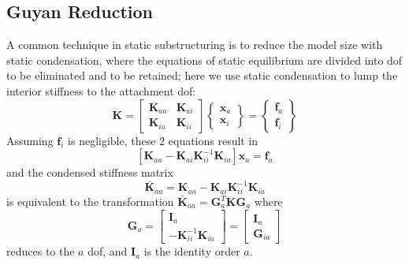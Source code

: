 \documentclass[10pt,openany,twoside]{book}
\numberwithin{equation}{section}   %
\newcommand{\Matrix}[1]{\boldsymbol{#1}}
\newcommand{\Vector}[1]{\boldsymbol{#1}}
\begin{document}
\subsection{\label{sect:guyan-red}Guyan Reduction}
A common technique in static substructuring is to reduce the
model size with static condensation, where the equations of
static equilibrium are divided into dof to be eliminated and to be
retained; here we use static condensation to lump the interior stiffness 
to the attachment dof:
\begin{equation}
\Matrix{K} = \left[
\begin{array}{cc}
   \Matrix{K}_{aa} & \Matrix{K}_{ai} \\
   \Matrix{K}_{ia} & \Matrix{K}_{ii}
\end{array}
\right]
\left\{
\begin{array}{c}
   \Vector{x}_a \\
   \Vector{x}_i
\end{array}
\right\} =
\left\{
\begin{array}{c}
   \Vector{f}_a \\
   \Vector{f}_i
\end{array}
\right\}		\nonumber
\end{equation}
Assuming $\Vector{f}_i$ is negligible, these 2 equations result in
\begin{displaymath}
\left[\Matrix{K}_{aa}
	- \Matrix{K}_{ai}\Matrix{K}_{ii}^{-1}\Matrix{K}_{ia}\right]
		\Vector{x}_a = \Vector{f}_a
\end{displaymath}
and the condensed stiffness matrix
\begin{equation}\label{eqn:condensedK}
\Matrix{\bar{K}}_{aa} = 
	\Matrix{K}_{aa} - \Matrix{K}_{ai}\Matrix{K}_{ii}^{-1}\Matrix{K}_{ia}
\end{equation}
is equivalent to the transformation
$\Matrix{\bar{K}}_{aa} = \Matrix{G}_a^T\Matrix{K}\Matrix{G}_a$
where
\begin{equation} \label{eqn:static-ss}
\Matrix{G}_a = \left[
	\begin{array}{c}
		\Matrix{I}_a \\
		-\Matrix{K}_{ii}^{-1}\Matrix{K}_{ia}
	\end{array} \right] =
	\left[\begin{array}{c}
		\Matrix{I}_a \\
		\Matrix{G}_{ia}
	\end{array} \right]
\end{equation}
reduces to the $a$ dof, and $\Matrix{I}_a$ is the identity order $a$.
\end{document}
